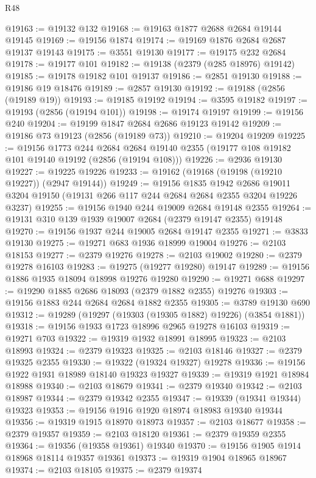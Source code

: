 \begin{lexlean}{R48}
\begin{coremodule}
@19163 := @19132 @132
@19168 := @19163 @1877 @2688 @2684 @19144 @19145
@19169 := @19156 @1874
@19174 := @19169 @1876 @2684 @2687 @19137 @19143
@19175 := @3551 @19130
@19177 := @19175 @232 @2684
@19178 := @19177 @101
@19182 := @19138 (@2379 (@285 @18976) @19142)
@19185 := @19178 @19182 @101 @19137
@19186 := @2851 @19130
@19188 := @19186 @19 @18476
@19189 := @2857 @19130
@19192 := @19188 (@2856 (@19189 @19))
@19193 := @19185 @19192
@19194 := @3595 @19182
@19197 := @19193 (@2856 (@19194 @101))
@19198 := @19174 @19197
@19199 := @19156 @240
@19204 := @19199 @1847 @2684 @2686 @19123 @19142
@19209 := @19186 @73 @19123 (@2856 (@19189 @73))
@19210 := @19204 @19209
@19225 := @19156
    @1773
    @244
    @2684
    @2684
    @19140
    @2355
    (@19177 @108 @19182 @101 @19140 @19192 (@2856 (@19194 @108)))
@19226 := @2936 @19130
@19227 := @19225 @19226
@19233 := @19162 (@19168 (@19198 (@19210 @19227)) (@2947 @19144))
@19249 := @19156
    @1835
    @1942
    @2686
    @19011
    @3204
    @19150
    (@19131 @266 @117 @244 @2684 @2684 @2355 @3204 @19226 @3237)
@19255 := @19156 @1940 @244 @19009 @2684 @19148 @2355
@19264 := @19131 @310 @139 @1939 @19007 @2684 (@2379 @19147 @2355) @19148
@19270 := @19156 @1937 @244 @19005 @2684 @19147 @2355
@19271 := @3833 @19130
@19275 := @19271 @683 @1936 @18999 @19004
@19276 := @2103 @18153
@19277 := @2379 @19276
@19278 := @2103 @19002
@19280 := @2379 @19278 @16103
@19283 := @19275 (@19277 @19280) @19147
@19289 := @19156 @1886 @1935 @18094 @18998 @19276 @19280
@19290 := @19271 @688
@19297 := @19290 @1885 @2686 @18093 (@2379 @1882 @2355) @19276
@19303 := @19156 @1883 @244 @2684 @2684 @1882 @2355
@19305 := @3789 @19130 @690
@19312 := @19289 (@19297 (@19303 (@19305 @1882) @19226) (@3854 @1881))
@19318 := @19156 @1933 @1723 @18996 @2965 @19278 @16103
@19319 := @19271 @703
@19322 := @19319 @1932 @18991 @18995
@19323 := @2103 @18993
@19324 := @2379 @19323
@19325 := @2103 @18146
@19327 := @2379 @19325 @2355
@19330 := @19322 (@19324 @19327) @19278
@19336 := @19156 @1922 @1931 @18989 @18140 @19323 @19327
@19339 := @19319 @1921 @18984 @18988
@19340 := @2103 @18679
@19341 := @2379 @19340
@19342 := @2103 @18987
@19344 := @2379 @19342 @2355
@19347 := @19339 (@19341 @19344) @19323
@19353 := @19156 @1916 @1920 @18974 @18983 @19340 @19344
@19356 := @19319 @1915 @18970 @18973
@19357 := @2103 @18677
@19358 := @2379 @19357
@19359 := @2103 @18120
@19361 := @2379 @19359 @2355
@19364 := @19356 (@19358 @19361) @19340
@19370 := @19156 @1905 @1914 @18968 @18114 @19357 @19361
@19373 := @19319 @1904 @18965 @18967
@19374 := @2103 @18105
@19375 := @2379 @19374

\end{coremodule}
\end{lexlean}

